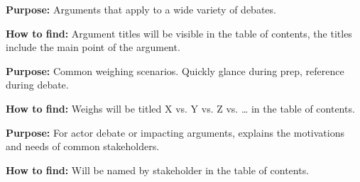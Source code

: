
\textbf{Purpose:} Arguments that apply to a wide variety of debates.

\textbf{How to find:} Argument titles will be visible in the table of contents, the titles include the main point of the argument.


\textbf{Purpose:} Common weighing scenarios. Quickly glance during prep, reference during debate.

\textbf{How to find:} Weighs will be titled X vs. Y vs. Z vs. … in the table of contents.


\textbf{Purpose:} For actor debate or impacting arguments, explains the motivations and needs of common stakeholders.

\textbf{How to find:} Will be named by stakeholder in the table of contents.




